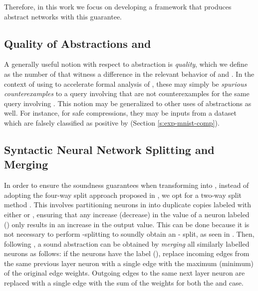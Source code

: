 Therefore, in this work we focus on developing a framework that produces
abstract networks with this guarantee.

\subsection{Quality of Abstractions and \gencex}
\label{s:qual}

A generally useful notion with respect to abstraction is \textit{quality},
which we define as the number of \textit{\gencex} that witness a difference in
the relevant behavior of \abs and \cnc. In the context of using \abs to
accelerate formal analysis of \dnn, these \gencex may simply be
\textit{spurious counterexamples} \cite{cegar-nn, cleverest-nn} to a query
involving \abs that are not counterexamples for the same query involving \cnc.
This notion may be generalized to other uses of abstractions as well. For
instance, for safe compressions, they may be inputs from a dataset which
are falsely classified as positive by \abs (Section \ref{s:exp-mnist-comp}).

\subsection{Syntactic Neural Network Splitting and Merging}
\label{s:nn-sam}

In order to ensure the soundness guarantees when transforming \cnc into \abs, 
instead of adopting the four-way split approach proposed in \cite{cegar-nn},
we opt for a two-way split method \cite{chauhan2022efficiently,liu2022abstraction,
10.1145/3644387}. This involves partitioning neurons in \cnc into duplicate
copies labeled with either {\inc or \dec}, ensuring that any increase 
(decrease) in the value of a neuron labeled \inc (\dec) only results in 
an increase in the output value. This can be done because it is not
necessary to perform \posc-\negc splitting to soundly obtain an \inc-\dec
split, as seen in \cite{chauhan2022efficiently,liu2022abstraction,
10.1145/3644387}. Then, following \cite{cegar-nn}, a sound 
abstraction can be obtained by \textit{merging} all similarly 
labelled neurons as follows: if the neurons have
the label \inc (\dec), replace incoming edges from the same
previous layer neuron with a single edge with the maximum (minimum) of the
original edge weights. Outgoing edges to the same next layer neuron are replaced
with a single edge with the sum of the weights for both the \inc and \dec case.


